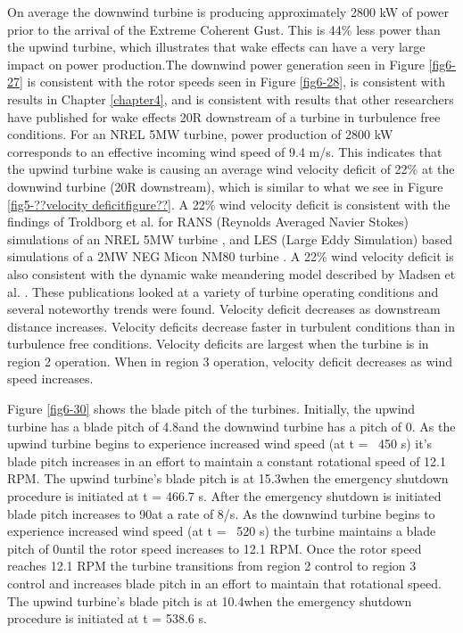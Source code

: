 On average the downwind turbine is producing approximately 2800 kW of power prior to the arrival of the Extreme Coherent Gust. This is 44\% less power than the upwind turbine, which illustrates that wake effects can have a very large impact on power production.The downwind power generation seen in Figure \ref{fig6-27} is consistent with the rotor speeds seen in Figure \ref{fig6-28}, is consistent with results in Chapter \ref{chapter4}, and is consistent with results that other researchers have published for wake effects 20R downstream of a turbine in turbulence free conditions. For an NREL 5MW turbine, power production of 2800 kW corresponds to an effective incoming wind speed of 9.4 m/s. This indicates that the upwind turbine wake is causing an average wind velocity deficit of 22\%  at the downwind turbine (20R downstream), which is similar to what we see in Figure \ref{fig5-??velocity deficitfigure??}. A 22\% wind velocity deficit is consistent with the findings of Troldborg et al. for RANS (Reynolds Averaged Navier Stokes) simulations of an NREL 5MW turbine \cite{troldborg2015}, and LES (Large Eddy Simulation) based simulations of a 2MW NEG Micon NM80 turbine \cite{troldborg2010,troldborg2010b}. A 22\% wind velocity deficit is also consistent with the dynamic wake meandering model described by Madsen et al. \cite{madsen2010}. These publications looked at a variety of turbine operating conditions and several noteworthy trends were found. Velocity deficit decreases as downstream distance increases. Velocity deficits decrease faster in turbulent conditions than in turbulence free conditions. Velocity deficits are largest when the turbine is in region 2 operation. When in region 3 operation, velocity deficit decreases as wind speed increases.


Figure \ref{fig6-30} shows the blade pitch of the turbines. Initially, the upwind turbine has a blade pitch of 4.8\degree and the downwind turbine has a pitch of 0\degree. As the upwind turbine begins to experience increased wind speed (at t = ~450 s) it's blade pitch increases in an effort to maintain a constant rotational speed of 12.1 RPM. The upwind turbine's blade pitch is at 15.3\degree when the emergency shutdown procedure is initiated at t = 466.7 s. After the emergency shutdown is initiated blade pitch increases to 90\degree at a rate of 8\degree /s. As the downwind turbine begins to experience increased wind speed (at t = ~520 s) the turbine maintains a blade pitch of 0\degree until the rotor speed increases to 12.1 RPM. Once the rotor speed reaches 12.1 RPM the turbine transitions from region 2 control to region 3 control and increases blade pitch in an effort to maintain that rotational speed. The upwind turbine's blade pitch is at 10.4\degree when the emergency shutdown procedure is initiated at t = 538.6 s.

